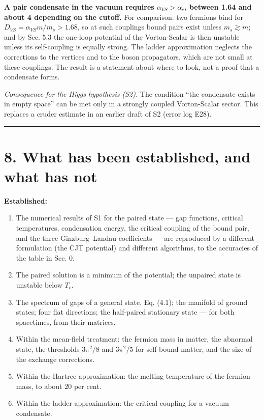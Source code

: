\documentclass[
  10pt,
]{article}
\providecommand{\tightlist}{%
  \setlength{\itemsep}{0pt}\setlength{\parskip}{0pt}}
\begin{document}
\textbf{A pair condensate in the vacuum requires
\(\alpha_{VS}>\alpha_c\), between 1.64 and about 4 depending on the
cutoff.} For comparison: two fermions bind for
\(D_{VS}=\alpha_{VS}m/m_s>1.68\), so at such couplings bound pairs exist
unless \(m_s\gtrsim m\); and by Sec. 5.3 the one-loop potential of the
Vorton-Scalar is then unstable unless its self-coupling is equally
strong. The ladder approximation neglects the corrections to the
vertices and to the boson propagators, which are not small at these
couplings. The result is a statement about where to look, not a proof
that a condensate forms.

\emph{Consequence for the Higgs hypothesis (S2).} The condition ``the
condensate exists in empty space'' can be met only in a strongly coupled
Vorton-Scalar sector. This replaces a cruder estimate in an earlier
draft of S2 (error log E28).

\begin{center}\rule{0.5\linewidth}{0.5pt}\end{center}

\hypertarget{what-has-been-established-and-what-has-not}{%
\section{8. What has been established, and what has
not}\label{what-has-been-established-and-what-has-not}}

\textbf{Established:}

\begin{enumerate}
\def\labelenumi{\arabic{enumi}.}
\tightlist
\item
  The numerical results of S1 for the paired state --- gap functions,
  critical temperatures, condensation energy, the critical coupling of
  the bound pair, and the three Ginzburg--Landau coefficients --- are
  reproduced by a different formulation (the CJT potential) and
  different algorithms, to the accuracies of the table in Sec. 0.
\item
  The paired solution is a minimum of the potential; the unpaired state
  is unstable below \(T_c\).
\item
  The spectrum of gaps of a general state, Eq. (4.1); the manifold of
  ground states; four flat directions; the half-paired stationary state
  --- for both spacetimes, from their matrices.
\item
  Within the mean-field treatment: the fermion mass in matter, the
  abnormal state, the thresholds \(3\pi^2/8\) and \(3\pi^2/5\) for
  self-bound matter, and the size of the exchange corrections.
\item
  Within the Hartree approximation: the melting temperature of the
  fermion mass, to about 20 per cent.
\item
  Within the ladder approximation: the critical coupling for a vacuum
  condensate.
\end{enumerate}
\end{document}

